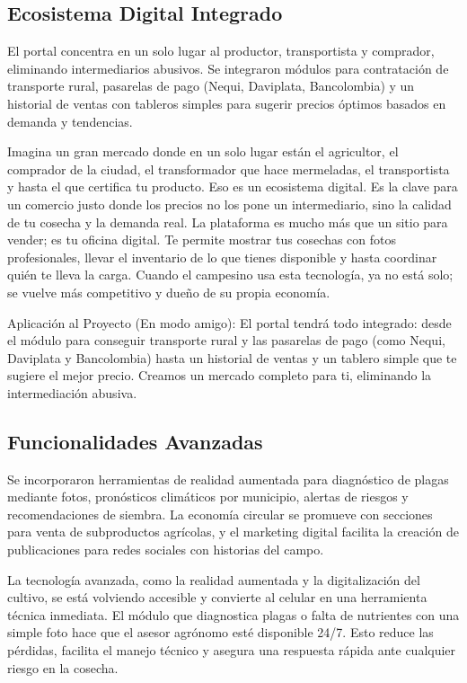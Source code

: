 \subsection{Ecosistema Digital Integrado}
El portal concentra en un solo lugar al productor, transportista y comprador, eliminando intermediarios abusivos. Se integraron módulos para contratación de transporte rural, pasarelas de pago (Nequi, Daviplata, Bancolombia) y un historial de ventas con tableros simples para sugerir precios óptimos basados en demanda y tendencias.

Imagina un gran mercado donde en un solo lugar están el agricultor, el comprador de la ciudad, el transformador que hace mermeladas, el transportista y hasta el que certifica tu producto. Eso es un ecosistema digital. Es la clave para un comercio justo donde los precios no los pone un intermediario, sino la calidad de tu cosecha y la demanda real. La plataforma es mucho más que un sitio para vender; es tu oficina digital. Te permite mostrar tus cosechas con fotos profesionales, llevar el inventario de lo que tienes disponible y hasta coordinar quién te lleva la carga. Cuando el campesino usa esta tecnología, ya no está solo; se vuelve más competitivo y dueño de su propia economía.

Aplicación al Proyecto (En modo amigo): El portal tendrá todo integrado: desde el módulo para conseguir transporte rural y las pasarelas de pago (como Nequi, Daviplata y Bancolombia) hasta un historial de ventas y un tablero simple que te sugiere el mejor precio. Creamos un mercado completo para ti, eliminando la intermediación abusiva.

\subsection{Funcionalidades Avanzadas}
Se incorporaron herramientas de realidad aumentada para diagnóstico de plagas mediante fotos, pronósticos climáticos por municipio, alertas de riesgos y recomendaciones de siembra. La economía circular se promueve con secciones para venta de subproductos agrícolas, y el marketing digital facilita la creación de publicaciones para redes sociales con historias del campo.

La tecnología avanzada, como la realidad aumentada y la digitalización del cultivo, se está volviendo accesible y convierte al celular en una herramienta técnica inmediata. El módulo que diagnostica plagas o falta de nutrientes con una simple foto hace que el asesor agrónomo esté disponible 24/7. Esto reduce las pérdidas, facilita el manejo técnico y asegura una respuesta rápida ante cualquier riesgo en la cosecha.

